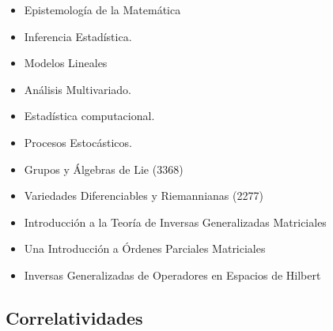 \documentclass[a4paper, 12pt]{article}
\begin{document}
\begin{itemize}
\item {Epistemología de la Matemática} 







\item  {Inferencia Estadística}. 

 
 


\item  {Modelos Lineales} 
 
 
\item  {Análisis Multivariado}. 
  





\item  {Estadística computacional}.  



\item  {Procesos Estocásticos}. 

  

\item { Grupos y Álgebras de Lie (3368)} 
\item { Variedades Diferenciables y Riemannianas  (2277)} 


\item { Introducción a la Teoría de Inversas Generalizadas Matriciales}  

\item {Una Introducción a Órdenes Parciales Matriciales} 

\item { Inversas Generalizadas de Operadores en Espacios de Hilbert } 
\end{itemize}




\subsection{Correlatividades}
 
\end{document}
